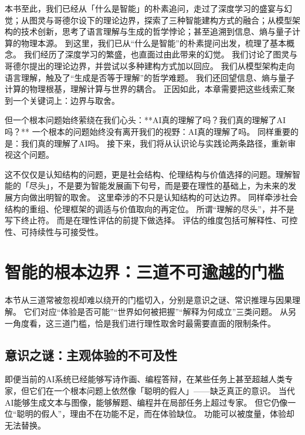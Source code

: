 本书至此，我们已经从「什么是智能」的朴素追问，走过了深度学习的盛宴与幻觉；从图灵与哥德尔设下的理论边界，探索了三种智能建构方式的融合；从模型架构的技术创新，思考了语言理解与生成的哲学悖论；甚至追溯到信息、熵与量子计算的物理本源。
到这里，我们已从“什么是智能”的朴素提问出发，梳理了基本概念。
我们经历了深度学习的繁盛，也直面过由此带来的幻觉。
我们讨论了图灵与哥德尔提出的理论边界，并尝试以多种建构方式加以回应。
我们从模型架构走向语言理解，触及了“生成是否等于理解”的哲学难题。
我们还回望信息、熵与量子计算的物理根基，理解计算与世界的耦合。
正因如此，本章需要把这些线索汇聚到一个关键词上：边界与取舍。

但一个根本问题始终萦绕在我们心头：**AI真的理解了吗？我们真的理解了AI吗？**
一个根本的问题始终没有离开我们的视野：AI真的理解了吗。
同样重要的是：我们真的理解了AI吗。
接下来，我们将从认识论与实践论两条路径，重新审视这个问题。

这不仅仅是认知结构的问题，更是社会结构、伦理结构与价值选择的问题。理解智能的「尽头」，不是要为智能发展画下句号，而是要在理性的基础上，为未来的发展方向做出明智的取舍。
这里牵涉的不只是认知结构的可达边界。
同样牵涉社会结构的重组、伦理框架的调适与价值取向的再定位。
所谓“理解的尽头”，并不是写下终止符。
而是在理性评估的前提下做选择。
评估的维度包括可解释性、可控性、可持续性与可接受性。

\section{智能的根本边界：三道不可逾越的门槛}

本节从三道常被忽视却难以绕开的门槛切入，分别是意识之谜、常识推理与因果理解。
它们对应“体验是否可能”“世界如何被把握”“解释为何成立”三类问题。
从另一角度看，这三道门槛，恰是我们进行理性取舍时最需要直面的限制条件。

\subsection{意识之谜：主观体验的不可及性}

即便当前的AI系统已经能够写诗作画、编程答辩，在某些任务上甚至超越人类专家，但它们在一个根本问题上依然像「聪明的假人」——缺乏真正的意识。
当代AI能够生成文本与图像，能够解题、编程并在局部任务上超过专家。
但它仍像一位“聪明的假人”，理由不在功能不足，而在体验缺位。
功能可以被度量，体验却无法替换。

